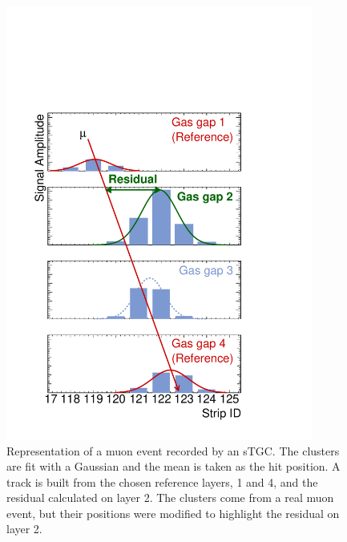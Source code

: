 \begin{figure}
    \centering
    \includegraphics[width = 0.9\textwidth]{figures/figure_fake_event_display.pdf}
    \caption{Representation of a muon event recorded by an sTGC. The clusters are fit with a Gaussian and the mean is taken as the hit position. A track is built from the chosen reference layers, 1 and 4, and the residual calculated on layer 2. The clusters come from a real muon event, but their positions were modified to highlight the residual on layer 2.}
    \label{fig:fake_event_display}
\end{figure}

